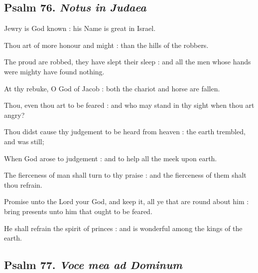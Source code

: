 \subsection{Psalm 76. \textit{Notus in Judaea}}

 Jewry is God known : his Name is great in Israel.\par
{}
Thou art of more honour and might : than the hills of the robbers.\par
{}The proud are robbed, they have slept their sleep : and all the men whose hands were mighty have found nothing.\par
{}At thy rebuke, O God of Jacob : both the chariot and horse are fallen.\par
{}Thou, even thou art to be feared : and who may stand in thy sight when thou art angry?\par
{}Thou didst cause thy judgement to be heard from heaven : the earth trembled, and was still;\par
{}When God arose to judgement : and to help all the meek upon earth.\par
{}The fierceness of man shall turn to thy praise : and the fierceness of them shalt thou refrain.\par
{}Promise unto the Lord your God, and keep it, all ye that are round about him : bring presents unto him that ought to be feared.\par
{}He shall refrain the spirit of princes : and is wonderful among the kings of the earth.\par

\subsection{Psalm 77. \textit{Voce mea ad Dominum}}

